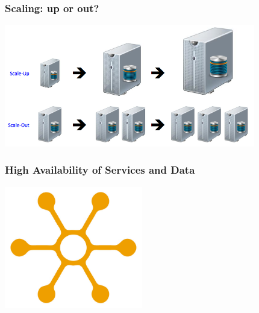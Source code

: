 \documentclass{beamer}
\begin{document}
\begin{frame}
  \frametitle{Scaling: up or out?}

  \begin{center}
    \includegraphics[height=2.1in]{KB_Scale_Out-Up.png}
  \end{center}
\end{frame}

\begin{frame}
  \frametitle{High Availability of Services and Data}

  \begin{center}
    \includegraphics[height=2.1in]{distribution.jpg}
  \end{center}
\end{frame}
\end{document}
